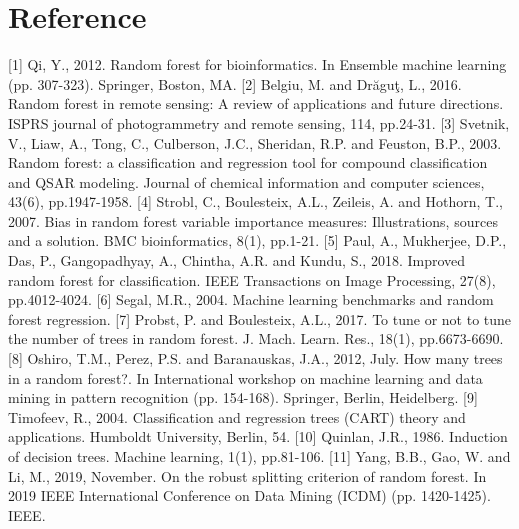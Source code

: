 \section{Reference}
[1] Qi, Y., 2012. Random forest for bioinformatics. In Ensemble machine learning (pp. 307-323). Springer, Boston, MA.
[2] Belgiu, M. and Drăguţ, L., 2016. Random forest in remote sensing: A review of applications and future directions. ISPRS journal of photogrammetry and remote sensing, 114, pp.24-31.
[3] Svetnik, V., Liaw, A., Tong, C., Culberson, J.C., Sheridan, R.P. and Feuston, B.P., 2003. Random forest: a classification and regression tool for compound classification and QSAR modeling. Journal of chemical information and computer sciences, 43(6), pp.1947-1958.
[4] Strobl, C., Boulesteix, A.L., Zeileis, A. and Hothorn, T., 2007. Bias in random forest variable importance measures: Illustrations, sources and a solution. BMC bioinformatics, 8(1), pp.1-21.
[5] Paul, A., Mukherjee, D.P., Das, P., Gangopadhyay, A., Chintha, A.R. and Kundu, S., 2018. Improved random forest for classification. IEEE Transactions on Image Processing, 27(8), pp.4012-4024.
[6] Segal, M.R., 2004. Machine learning benchmarks and random forest regression.
[7] Probst, P. and Boulesteix, A.L., 2017. To tune or not to tune the number of trees in random forest. J. Mach. Learn. Res., 18(1), pp.6673-6690.
[8] Oshiro, T.M., Perez, P.S. and Baranauskas, J.A., 2012, July. How many trees in a random forest?. In International workshop on machine learning and data mining in pattern recognition (pp. 154-168). Springer, Berlin, Heidelberg.
[9] Timofeev, R., 2004. Classification and regression trees (CART) theory and applications. Humboldt University, Berlin, 54.
[10] Quinlan, J.R., 1986. Induction of decision trees. Machine learning, 1(1), pp.81-106.
[11] Yang, B.B., Gao, W. and Li, M., 2019, November. On the robust splitting criterion of random forest. In 2019 IEEE International Conference on Data Mining (ICDM) (pp. 1420-1425). IEEE.